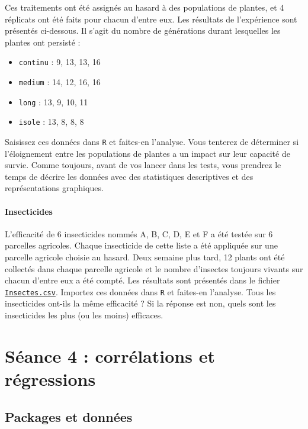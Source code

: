 \documentclass[a4paperpaper,]{article}
\providecommand{\tightlist}{%
  \setlength{\itemsep}{0pt}\setlength{\parskip}{0pt}}
\let\oldparagraph\paragraph
\renewcommand{\paragraph}[1]{\oldparagraph{#1}\mbox{}}
\begin{document}
Ces traitements ont été assignés au hasard à des populations de plantes, et 4 réplicats ont été faits pour chacun d'entre eux. Les résultats de l'expérience sont présentés ci-dessous. Il s'agit du nombre de générations durant lesquelles les plantes ont persisté :

\begin{itemize}
\tightlist
\item
  \texttt{continu} : 9, 13, 13, 16
\item
  \texttt{medium} : 14, 12, 16, 16
\item
  \texttt{long} : 13, 9, 10, 11
\item
  \texttt{isole} : 13, 8, 8, 8
\end{itemize}

Saisissez ces données dans \texttt{R} et faites-en l'analyse. Vous tenterez de déterminer si l'éloignement entre les populations de plantes a un impact sur leur capacité de survie. Comme toujours, avant de vos lancer dans les tests, vous prendrez le temps de décrire les données avec des statistiques descriptives et des représentations graphiques.

\hypertarget{insecticides}{%
\paragraph{Insecticides}\label{insecticides}}

L'efficacité de 6 insecticides nommés A, B, C, D, E et F a été testée sur 6 parcelles agricoles. Chaque insecticide de cette liste a été appliquée sur une parcelle agricole choisie au hasard. Deux semaine plus tard, 12 plants ont été collectés dans chaque parcelle agricole et le nombre d'insectes toujours vivants sur chacun d'entre eux a été compté. Les résultats sont présentés dans le fichier \href{https://besibo.github.io/Biometrie3/data/Insectes.csv}{\texttt{Insectes.csv}}. Importez ces données dans \texttt{R} et faites-en l'analyse. Tous les insecticides ont-ils la même efficacité ? Si la réponse est non, quels sont les insecticides les plus (ou les moins) efficaces.

\hypertarget{suxe9ance-4-corruxe9lations-et-ruxe9gressions}{%
\section{Séance 4 : corrélations et régressions}\label{suxe9ance-4-corruxe9lations-et-ruxe9gressions}}

\hypertarget{packages-et-donnuxe9es-1}{%
\subsection{Packages et données}\label{packages-et-donnuxe9es-1}}
\end{document}
